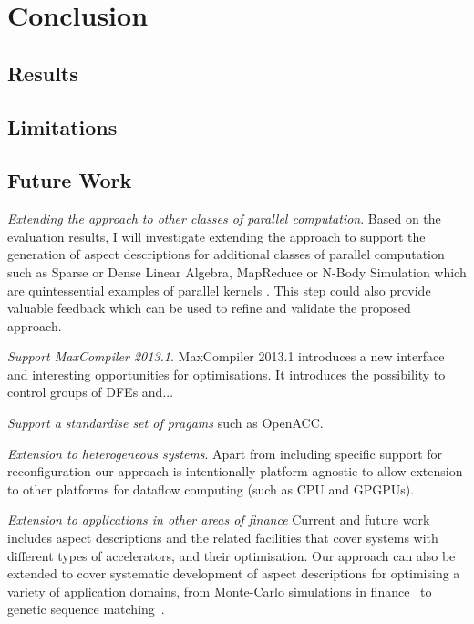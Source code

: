 \chapter{Conclusion}

\section{Results}

\section{Limitations}

\section{Future Work}

\emph{Extending the approach to other classes of parallel
  computation}.  Based on the evaluation results, I will investigate
extending the approach to support the generation of aspect
descriptions for additional classes of parallel computation such as
Sparse or Dense Linear Algebra, MapReduce or N-Body Simulation which
are quintessential examples of parallel kernels
\cite{Asanovic:Bodik:Catanzaro:Gebis:Husbands:Keutzer:Patterson:Plishker:Shalf:Williams:Yelick:2006}. This
step could also provide valuable feedback which can be used to refine
and validate the proposed approach.

\emph{Support MaxCompiler 2013.1}. MaxCompiler 2013.1 introduces a new
interface and interesting opportunities for optimisations. It
introduces the possibility to control groups of DFEs and...

\emph{Support a standardise set of pragams} such as OpenACC.

\emph{Extension to heterogeneous systems}. Apart from including
specific support for reconfiguration our approach is intentionally
platform agnostic to allow extension to other platforms for dataflow
computing (such as CPU and GPGPUs).

\emph{Extension to applications in other areas of finance}
Current and future work includes aspect descriptions and the related
facilities that cover systems with different types of accelerators,
and their optimisation. Our approach can also be extended to cover
systematic development of aspect descriptions for optimising a variety
of application domains, from Monte-Carlo simulations in
finance~\cite{Jin:2012} to genetic sequence
matching~\cite{Arram:2013}.
